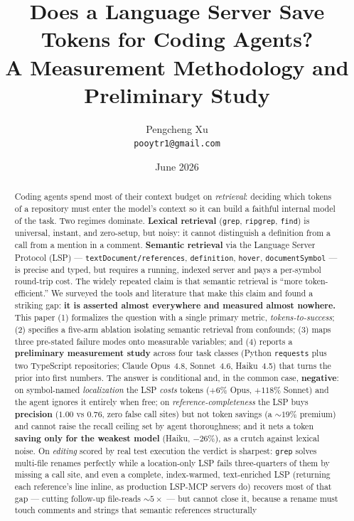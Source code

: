 \documentclass[11pt]{article}
\title{Does a Language Server Save Tokens for Coding Agents?\\
\large A Measurement Methodology and Preliminary Study}
\author{Pengcheng Xu \\ \small \texttt{pooytr1@gmail.com}}
\date{June 2026}
\newcommand{\code}[1]{\texttt{#1}}
\begin{document}
\maketitle

\begin{abstract}
Coding agents spend most of their context budget on \emph{retrieval}: deciding which tokens of a
repository must enter the model's context so it can build a faithful internal model of the task. Two
regimes dominate. \textbf{Lexical retrieval} (\code{grep}, \code{ripgrep}, \code{find}) is universal,
instant, and zero-setup, but noisy: it cannot distinguish a definition from a call from a mention in a
comment. \textbf{Semantic retrieval} via the Language Server Protocol (LSP) ---
\code{textDocument/references}, \code{definition}, \code{hover}, \code{documentSymbol} --- is precise
and typed, but requires a running, indexed server and pays a per-symbol round-trip cost. The widely
repeated claim is that semantic retrieval is ``more token-efficient.'' We surveyed the tools and
literature that make this claim and found a striking gap: \textbf{it is asserted almost everywhere and
measured almost nowhere.} This paper (1) formalizes the question with a single primary metric,
\emph{tokens-to-success}; (2) specifies a five-arm ablation isolating semantic retrieval from
confounds; (3) maps three pre-stated failure modes onto measurable variables; and (4) reports a
\textbf{preliminary measurement study} across four task classes (Python \code{requests} plus two
TypeScript repositories; Claude Opus~4.8, Sonnet~4.6, Haiku~4.5) that turns the prior into first
numbers. The answer is conditional and, in the common case,
\textbf{negative}: on symbol-named \emph{localization} the LSP \emph{costs} tokens ($+6\%$ Opus,
$+118\%$ Sonnet) and the agent ignores it entirely when free; on \emph{reference-completeness} the LSP
buys \textbf{precision} ($1.00$ vs $0.76$, zero false call sites) but not token savings (a ${\sim}19\%$
premium) and cannot raise the recall ceiling set by agent thoroughness; and it nets a token
\textbf{saving only for the weakest model} (Haiku, $-26\%$), as a crutch against lexical noise. On
\emph{editing} scored by real test execution the verdict is sharpest: \code{grep} solves multi-file
renames perfectly while a location-only LSP fails three-quarters of them by missing a call site, and even
a complete, index-warmed, text-enriched LSP (returning each reference's line inline, as production
LSP-MCP servers do) recovers most of that gap --- cutting follow-up file-reads ${\sim}5\times$ --- but
cannot close it, because a rename must touch comments and strings that semantic references structurally

\end{abstract}
\end{document}
